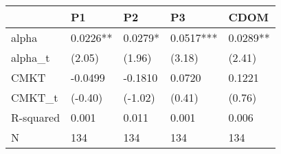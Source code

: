 \begin{tabular}{lllll}
\toprule
 & P1 & P2 & P3 & CDOM \\
\midrule
alpha & 0.0226** & 0.0279* & 0.0517*** & 0.0289** \\
alpha_t & (2.05) & (1.96) & (3.18) & (2.41) \\
CMKT & -0.0499 & -0.1810 & 0.0720 & 0.1221 \\
CMKT_t & (-0.40) & (-1.02) & (0.41) & (0.76) \\
R-squared & 0.001 & 0.011 & 0.001 & 0.006 \\
N & 134 & 134 & 134 & 134 \\
\bottomrule
\end{tabular}
